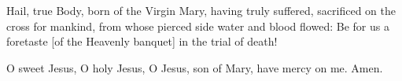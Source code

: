 \begin{enpars}Hail, true Body, born
of the Virgin Mary,
having truly suffered, sacrificed
on the cross for mankind,
from whose pierced side
water and blood flowed:
Be for us a foretaste [of the Heavenly banquet]
in the trial of death!

O sweet Jesus, O holy Jesus,
O Jesus, son of Mary,
have mercy on me. Amen.\end{enpars}